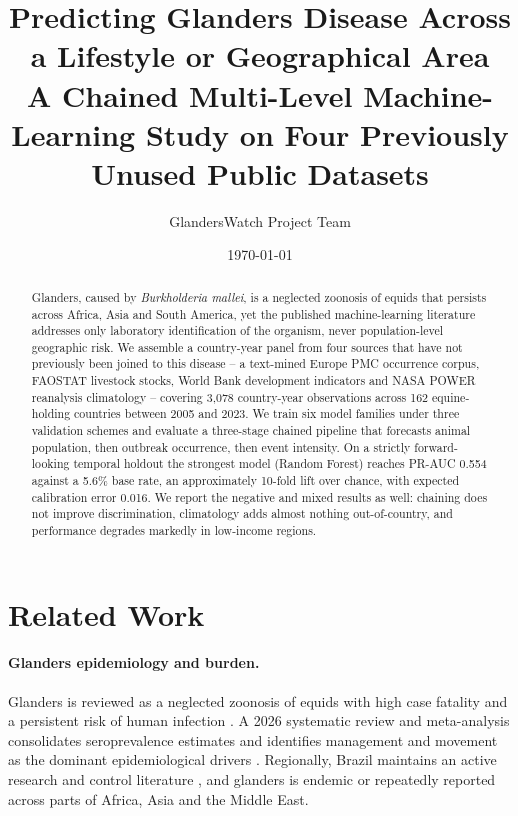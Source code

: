 \documentclass[11pt]{article}
\title{\textbf{Predicting Glanders Disease Across a Lifestyle or Geographical Area}\\[0.4em]
\large A Chained Multi-Level Machine-Learning Study on Four Previously Unused Public Datasets}
\author{GlandersWatch Project Team}
\date{\today}
\begin{document}
\maketitle

\begin{abstract}
\noindent
Glanders, caused by \emph{Burkholderia mallei}, is a neglected zoonosis of equids that persists
across Africa, Asia and South America, yet the published machine-learning literature addresses
only laboratory identification of the organism, never population-level geographic risk. We
assemble a country-year panel from four sources that have not previously been joined to this
disease -- a text-mined Europe PMC occurrence corpus, FAOSTAT livestock stocks, World Bank
development indicators and NASA POWER reanalysis climatology -- covering
3,078 country-year observations across 162 equine-holding
countries between 2005 and 2023. We train six model families under three validation schemes and
evaluate a three-stage chained pipeline that forecasts animal population, then outbreak
occurrence, then event intensity. On a strictly forward-looking temporal holdout the strongest model
(Random Forest) reaches PR-AUC 0.554 against a
5.6\% base rate, an approximately 10-fold lift over chance, with expected
calibration error 0.016. We report the negative and mixed results as well: chaining does not
improve discrimination, climatology adds almost nothing out-of-country, and performance degrades
markedly in low-income regions.
\end{abstract}

\tableofcontents
\newpage


\section{Related Work}
\label{sec:related}

\paragraph{Glanders epidemiology and burden.}
Glanders is reviewed as a neglected zoonosis of equids with high case fatality and a
persistent risk of human infection \cite{khan2013,kanani2026}. A 2026 systematic review
and meta-analysis consolidates seroprevalence estimates and identifies management and
movement as the dominant epidemiological drivers \cite{purnama2026}. Regionally, Brazil
maintains an active research and control literature \cite{mota2022}, and glanders is
endemic or repeatedly reported across parts of Africa, Asia and the Middle East.
\end{document}
